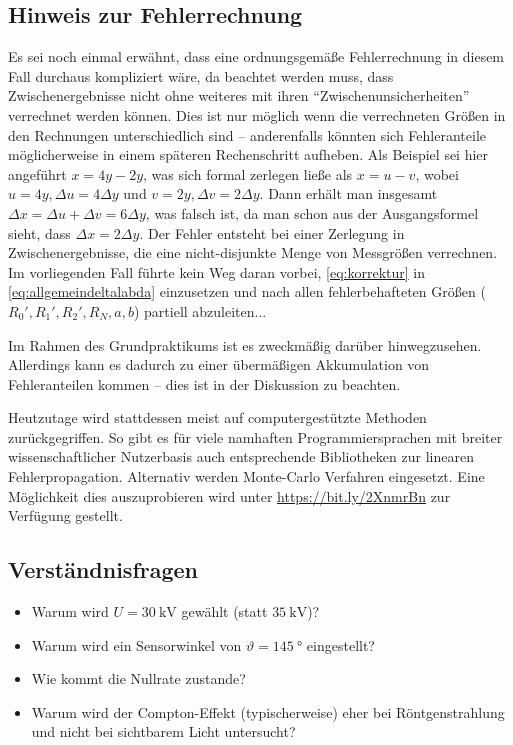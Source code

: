 \documentclass[ngerman,a4paper,twocolumn,twoside]{scrartcl}
\begin{document}
\subsection*{Hinweis zur Fehlerrechnung}
Es sei noch einmal erwähnt, dass eine ordnungsgemäße Fehlerrechnung in diesem Fall durchaus kompliziert wäre, da beachtet werden muss, dass Zwischenergebnisse nicht ohne weiteres mit ihren \enquote{Zwischenunsicherheiten} verrechnet werden können. Dies ist nur möglich wenn die verrechneten Größen in den Rechnungen unterschiedlich sind -- anderenfalls könnten sich Fehleranteile möglicherweise in einem späteren Rechenschritt aufheben. Als Beispiel sei hier angeführt $x=4y-2y$, was sich formal zerlegen ließe als $x=u-v$, wobei $u=4y, \Delta u=4\Delta y$ und $v=2y, \Delta v=2\Delta y$. Dann erhält man insgesamt $\Delta x = \Delta u + \Delta v=6\Delta y$, was falsch ist, da man schon aus der Ausgangsformel sieht, dass $\Delta x=2\Delta y$. Der Fehler entsteht bei einer Zerlegung in Zwischenergebnisse, die eine nicht-disjunkte Menge von Messgrößen verrechnen. Im vorliegenden Fall führte kein Weg daran vorbei, \cref{eq:korrektur} in \cref{eq:allgemeindeltalabda} einzusetzen und nach allen fehlerbehafteten Größen ($R_0',R_1',R_2',R_N,a,b$) partiell abzuleiten...
\par
Im Rahmen des Grundpraktikums ist es zweckmäßig darüber hinwegzusehen. Allerdings kann es dadurch zu einer übermäßigen Akkumulation von Fehleranteilen kommen -- dies ist in der Diskussion zu beachten.
\par
Heutzutage wird stattdessen meist auf computergestützte Methoden zurückgegriffen. So gibt es für viele namhaften Programmiersprachen mit breiter wissenschaftlicher Nutzerbasis auch entsprechende Bibliotheken zur linearen Fehlerpropagation. Alternativ werden Monte-Carlo Verfahren eingesetzt. Eine Möglichkeit dies auszuprobieren wird unter \url{https://bit.ly/2XnmrBn} zur Verfügung gestellt.
\subsection*{Verständnisfragen}
\begin{itemize}
\item Warum wird $U=\SI{30}{\kilo\volt}$ gewählt (statt $\SI{35}{\kilo\volt}$)?
\item Warum wird ein Sensorwinkel von $\vartheta=\SI{145}{\degree}$ eingestellt?
\item Wie kommt die Nullrate zustande?
\item Warum wird der Compton-Effekt (typischerweise) eher bei Röntgenstrahlung und nicht bei sichtbarem Licht untersucht?
\end{itemize}
\end{document}
